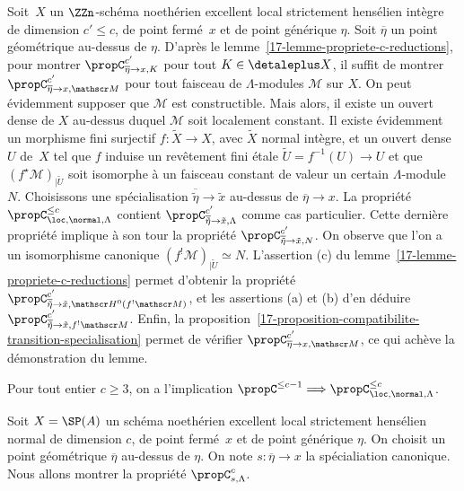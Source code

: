 \documentclass[10pt]{../fichiers-configuration-latex/smfart}
\begin{document}
Soit $X$ un $\ZZn$-schéma noethérien excellent
local strictement hensélien intègre de dimension $c'\leq c$, de point
fermé $x$ et de point générique $\eta$. Soit $\overline\eta$ un point
géométrique au-dessus de $\eta$. D'après le 
lemme~\ref{17-lemme-propriete-c-reductions}, pour montrer 
$\propC^{c'}_{\overline\eta\to x,K}$ pour tout $K\in\detaleplus X$, il suffit
de montrer $\propC^{c'}_{\overline\eta\to x,\mathscr M}$ pour tout faisceau
de $\Lambda$-modules $\mathscr M$ sur $X$. On peut évidemment supposer que
$\mathscr M$ est constructible. Mais alors, il existe un ouvert dense de
$X$ au-dessus duquel $\mathscr M$ soit localement constant. Il existe
évidemment un morphisme fini surjectif $f\colon \tilde X\to X$, avec
$\tilde X$ normal intègre, et un ouvert dense $U$ de $X$ tel que $f$
induise un revêtement fini étale $\tilde U=f^{-1}(U)\to U$ et que
$(f^\star \mathscr M)_{|\tilde U}$ soit isomorphe à un faisceau constant de
valeur un certain $\Lambda$-module $N$. Choisissons une spécialisation
$\overline {\tilde \eta}\to \tilde x$ au-dessus de
$\overline\eta\to x$. La propriété $\propC^{\leq c}_{\loc,\normal,\Lambda}$
contient $\propC^{c'}_{\overline {\tilde \eta}\to \tilde x,\Lambda}$
comme cas particulier. Cette dernière propriété
implique à son tour la propriété 
$\propC^{c'}_{\overline {\tilde \eta}\to \tilde x,N}$. On observe que l'on
a un isomorphisme canonique $(f^!\mathscr M)_{|\tilde U}\simeq N$.
L'assertion (c) du lemme~\ref{17-lemme-propriete-c-reductions} permet
d'obtenir la propriété $\propC^{c'}_{\overline {\tilde \eta}\to \tilde
x,{\mathscr H}^0(f^!\mathscr M)}$, et les assertions (a) et (b) d'en
déduire $\propC^{c'}_{\overline {\tilde \eta}\to \tilde
x,f^!\mathscr M}$. Enfin, la 
proposition~\ref{17-proposition-compatibilite-transition-specialisation}
permet de vérifier $\propC^{c'}_{\overline\eta\to x,\mathscr M}$, ce
qui achève la démonstration du lemme.


\begin{lemme2}\label{17-lemme-propriete-c-etape-de-recurrence}
Pour tout entier $c\geq 3$, on a l'implication $\propC^{\leq
c-1}\Longrightarrow \propC^{\leq c}_{\loc,\normal,\Lambda}$.
\end{lemme2}

Soit $X=\SP(A)$
un schéma noethérien excellent local strictement hensélien normal
de dimension $c$, de point fermé $x$ et de point générique $\eta$. On
choisit un point géométrique $\overline \eta$ au-dessus de $\eta$. On note
$s\colon \overline\eta\to x$ la spécialiation canonique.
Nous
allons montrer la propriété $\propC^c_{s,\Lambda}$.
\end{document}
